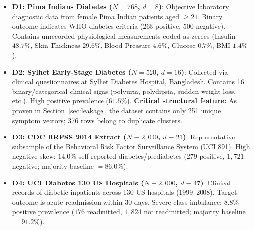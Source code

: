\documentclass[journal,twocolumn]{IEEEtran}
\begin{document}
\begin{itemize}[leftmargin=*]
    \item \textbf{D1: Pima Indians Diabetes ($N=768$, $d=8$)}: Objective laboratory diagnostic data from female Pima Indian patients aged $\ge 21$. Binary outcome indicates WHO diabetes criteria ($268$ positive, $500$ negative). Contains unrecorded physiological measurements coded as zeroes (Insulin $48.7\%$, Skin Thickness $29.6\%$, Blood Pressure $4.6\%$, Glucose $0.7\%$, BMI $1.4\%$).
    \item \textbf{D2: Sylhet Early-Stage Diabetes ($N=520$, $d=16$)}: Collected via clinical questionnaires at Sylhet Diabetes Hospital, Bangladesh. Contains 16 binary/categorical clinical signs (polyuria, polydipsia, sudden weight loss, etc.). High positive prevalence ($61.5\%$). \textbf{Critical structural feature:} As proven in Section~\ref{sec:leakage}, the dataset contains only 251 unique symptom vectors; 376 rows belong to duplicate clusters.
    \item \textbf{D3: CDC BRFSS 2014 Extract ($N=2{,}000$, $d=21$)}: Representative subsample of the Behavioral Risk Factor Surveillance System (UCI 891). High negative skew: $14.0\%$ self-reported diabetes/prediabetes ($279$ positive, $1{,}721$ negative; majority baseline $= 86.0\%$).
    \item \textbf{D4: UCI Diabetes 130-US Hospitals ($N=2{,}000$, $d=47$)}: Clinical records of diabetic inpatients across 130 US hospitals (1999--2008). Target outcome is acute readmission within 30 days. Severe class imbalance: $8.8\%$ positive prevalence ($176$ readmitted, $1{,}824$ not readmitted; majority baseline $= 91.2\%$).
\end{itemize}
\end{document}
